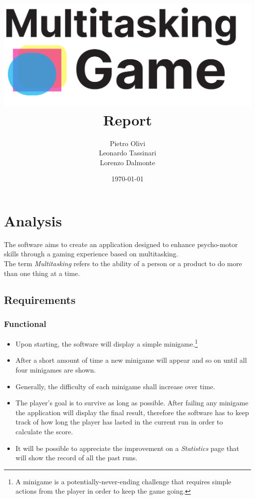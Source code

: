 \documentclass[a4paper,12pt]{report}
\title{\includegraphics[width=\textwidth]{res/logoInverted.pdf}
\\ \textbf {Report}}
\author{Pietro Olivi\\
Leonardo Tassinari\\
Lorenzo Dalmonte}
\date{\today}
\begin{document}
\maketitle

\tableofcontents

\chapter{Analysis}
The software aims to create an application designed to enhance psycho-motor skills through a gaming experience based on multitasking.\\
The term \textit{Multitasking} refers to the ability of a person or a product to do more than one thing at a time.

\section{Requirements}
\subsection*{Functional}
\begin{itemize}
	\item Upon starting, the software will display a simple minigame.\footnote{A minigame is a potentially-never-ending challenge that requires simple actions from the player in order to keep the game going.}
	\item After a short amount of time a new minigame will appear and so on until all four minigames are shown.
	\item Generally, the difficulty of each minigame shall increase over time.
	\item The player's goal is to survive as long as possible. After failing any minigame the application will display the final result,
	      therefore the software has to keep track of how long the player has lasted in the current run in order to calculate the score.
	\item It will be possible to appreciate the improvement on a \textit{Statistics} page that will show the record of all the past runs.
\end{itemize}
\end{document}
